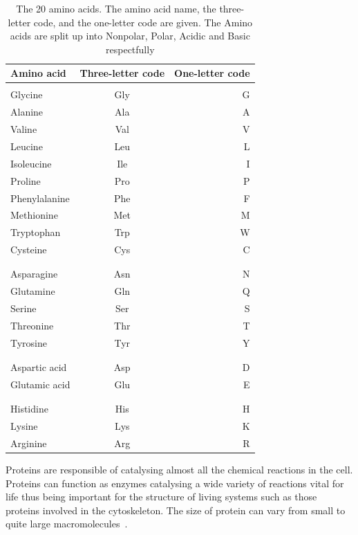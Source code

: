 \documentclass{report}
\begin{document}
\begin{table}[h!]
    \begin{center}
    \label{tab:Amino acids}
        \begin{tabular}{l|c|r}
        Amino acid & Three-letter code & One-letter code\\
        \hline
        \\
        Glycine & Gly & G\\
        Alanine & Ala & A\\
        Valine & Val & V\\
        Leucine & Leu & L\\
        Isoleucine & Ile & I\\
        Proline & Pro & P\\
        Phenylalanine & Phe & F\\
        Methionine & Met & M\\
        Tryptophan & Trp & W\\
        Cysteine & Cys & C\\
        \\
        \hline
        \\
        Asparagine & Asn & N\\
        Glutamine & Gln & Q\\
        Serine & Ser & S\\
        Threonine & Thr & T\\
        Tyrosine & Tyr & Y\\
        \\
        \hline
        \\
        Aspartic acid & Asp & D\\
        Glutamic acid & Glu & E\\
        \\
        \hline
        \\
        Histidine & His & H\\
        Lysine & Lys & K\\
        Arginine & Arg & R\\
        \end{tabular}
        \caption{\label{Amino acids}The 20 amino acids. The amino acid name, the three-letter code, and the one-letter code are given. The Amino acids are split up into Nonpolar, Polar, Acidic and Basic respectfully}
    \end{center}
\end{table}

Proteins are responsible of catalysing almost all the chemical reactions in the cell. Proteins can function as enzymes catalysing a wide variety of reactions vital for life thus being important for the structure of living systems such as those proteins involved in the cytoskeleton. The size of protein can vary from small to quite large macromolecules~\cite{zvelebil_understanding_2008}.
\end{document}
